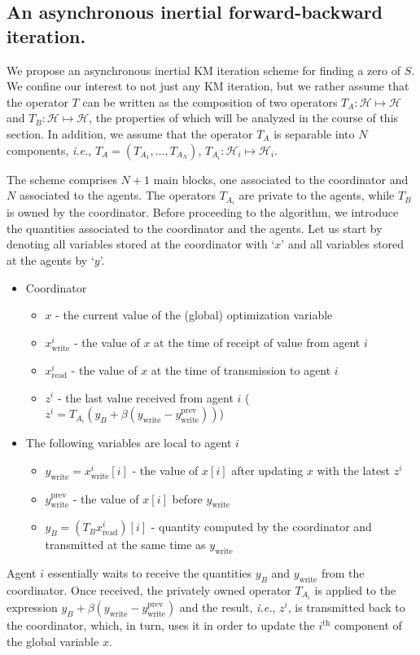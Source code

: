 \documentclass[envcountsect]{svjour3}
\newcommand{\ie}{{\it i.e.}}
\newcommand{\Hil}{{\mathcal{H} }}
\begin{document}
\subsection{An asynchronous inertial forward-backward iteration. }\label{sec::ourAlg} %
We propose an asynchronous inertial KM iteration scheme for finding a zero of $S$. We confine our interest to not just any KM iteration, but we rather assume
that the operator $T$ can be written as the composition of two operators $T_A:\Hil\mapsto\Hil$ and $T_B:\Hil\mapsto\Hil$, the properties
of which will be analyzed in the course of this section. In addition, we assume that the operator $T_A$ is separable
into $N$ components, \ie, $T_A=(T_{A_1},\ldots,T_{A_N})$, $T_{A_i}:\Hil_i\mapsto\Hil_i$.

The scheme comprises $N+1$ main blocks, one associated to the coordinator and $N$ associated to the agents. The operators $T_{A_i}$ are private to the agents, while $T_B$ is owned by the coordinator. Before proceeding to the algorithm, we introduce the quantities associated to the coordinator and the agents. Let us start by denoting all variables stored at the coordinator with `$x$' and all variables stored at the agents by `$y$'.

\begin{itemize}
\item Coordinator
  \begin{itemize}
  \item $x$ - the current value of the (global) optimization variable
  \item $x^i_\mathrm{write}$ - the value of $x$ at the time of receipt of value from agent $i$
  \item $x^i_\mathrm{read}$ - the value of $x$ at the time of transmission to agent $i$
  \item $z^i$ - the last value received from agent $i$ ($z^i=T_{A_i}\left(y_B+\beta(y_\mathrm{write}-y_\mathrm{write}^\mathrm{prev})\right)$)
  \end{itemize}
\item The following variables are local to agent $i$
  \begin{itemize}
  \item $y_\mathrm{write}=x^i_\mathrm{write}[i]$ - the value of $x[i]$ after updating $x$ with the latest $z^i$
  \item $y_\mathrm{write}^\mathrm{prev}$ - the value of $x[i]$ before $y_\mathrm{write}$
  \item $y_B=(T_Bx^i_\mathrm{read})[i]$ - quantity computed by the coordinator and transmitted at the same time as $y_\mathrm{write}$
  \end{itemize}
\end{itemize}
Agent $i$ essentially waits to receive the quantities $y_B$ and $y_\mathrm{write}$ from the coordinator. Once received, the privately owned operator $T_{A_i}$ is applied to the expression $y_B+\beta(y_\mathrm{write}-y_\mathrm{write}^\mathrm{prev})$ and the result, \ie, $z^i$, is transmitted back to the coordinator, which, in turn, uses it in order to update the $i^\mathrm{th}$ component of the global variable $x$.
\end{document}
